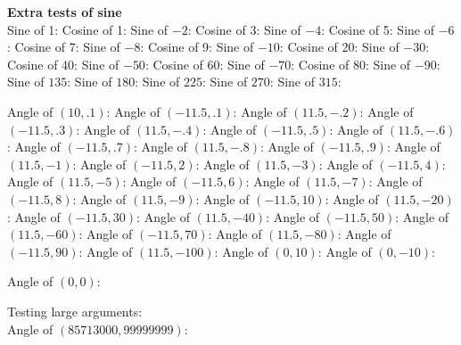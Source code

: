 \filbreak
{\bf Extra tests of sine}\\
Sine of 1:\Z\w
Cosine of 1:\Z\w
Sine of $-2$:\Z\w
Cosine of 3:\Z\w
Sine of $-4$:\Z\w
Cosine of 5:\Z\w
Sine of $-6$:\Z\w
Cosine of 7:\Z\w
Sine of $-8$:\Z\w
Cosine of 9:\Z\w
Sine of $-10$:\Z\w
Cosine of 20:\Z\w
Sine of $-30$:\Z\w
Cosine of 40:\Z\w
Sine of $-50$:\Z\w
Cosine of 60:\Z\w
Sine of $-70$:\Z\w
Cosine of 80:\Z\w
Sine of $-90$:\Z\w
Sine of $135$:\Z\w
Sine of $180$:\Z\w
Sine of $225$:\Z\w
Sine of $270$:\Z\w
Sine of $315$:\Z\W

\medskip
\noindent
Angle of $(10,.1)$:\Z\w
Angle of $(-11.5,.1)$:\Z\w
Angle of $(11.5,-.2)$:\Z\w
Angle of $(-11.5,.3)$:\Z\w
Angle of $(11.5,-.4)$:\Z\w
Angle of $(-11.5,.5)$:\Z\w
Angle of $(11.5,-.6)$:\Z\w
Angle of $(-11.5,.7)$:\Z\w
Angle of $(11.5,-.8)$:\Z\w
Angle of $(-11.5,.9)$:\Z\w
 Angle of $(11.5,-1)$:\Z\w
 Angle of $(-11.5,2)$:\Z\w
 Angle of $(11.5,-3)$:\Z\w
 Angle of $(-11.5,4)$:\Z\w
 Angle of $(11.5,-5)$:\Z\w
 Angle of $(-11.5,6)$:\Z\w
 Angle of $(11.5,-7)$:\Z\w
 Angle of $(-11.5,8)$:\Z\w
 Angle of $(11.5,-9)$:\Z\w
Angle of $(-11.5,10)$:\Z\w
Angle of $(11.5,-20)$:\Z\w
Angle of $(-11.5,30)$:\Z\w
Angle of $(11.5,-40)$:\Z\w
Angle of $(-11.5,50)$:\Z\w
Angle of $(11.5,-60)$:\Z\w
Angle of $(-11.5,70)$:\Z\w
Angle of $(11.5,-80)$:\Z\w
Angle of $(-11.5,90)$:\Z\w
Angle of $(11.5,-100)$:\Z\w
Angle of $(0,10)$:\Z\w
Angle of $(0,-10)$:\Z\w
\immediate{}
Angle of $(0,0)$:\Z\W

\noindent
Testing large arguments:\\
Angle of $(85 713 000, 99 999 999)$:\Z\W


